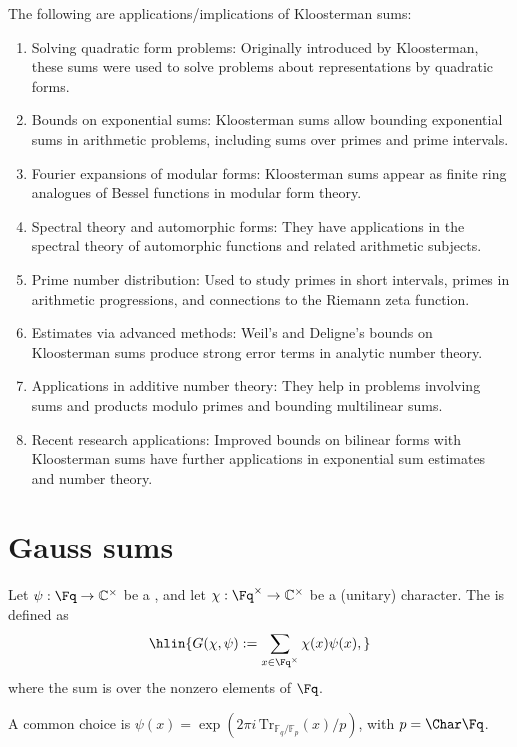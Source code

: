 The following are applications/implications of Kloosterman sums:
\begin{enumerate}
  \item Solving quadratic form problems: Originally introduced by Kloosterman, these sums were used to solve problems about representations by quadratic forms.
  \item Bounds on exponential sums: Kloosterman sums allow bounding exponential sums in arithmetic problems, including sums over primes and prime intervals.
  \item Fourier expansions of modular forms: Kloosterman sums appear as finite ring analogues of Bessel functions in modular form theory.
  \item Spectral theory and automorphic forms: They have applications in the spectral theory of automorphic functions and related arithmetic subjects.
  \item Prime number distribution: Used to study primes in short intervals, primes in arithmetic progressions, and connections to the Riemann zeta function.
  \item Estimates via advanced methods: Weil’s and Deligne’s bounds on Kloosterman sums produce strong error terms in analytic number theory.
  \item Applications in additive number theory: They help in problems involving sums and products modulo primes and bounding multilinear sums.
  \item Recent research applications: Improved bounds on bilinear forms with Kloosterman sums have further applications in exponential sum estimates and number theory.
\end{enumerate}


\section{Gauss sums}

\begin{definition} \label{definition:gauss_}
    Let $\psi : \Fq \to \mathbb{C}^\times$ be a    , and let 
    $\chi : \Fq^\times \to \mathbb{C}^\times$
    be a  (unitary) character.  
    The  is defined as  
    $$\hlin{G(\chi, \psi) := \sum_{x \in \Fq^\times} \chi(x) \psi(x),}$$  
    where the sum is over the nonzero elements of $\Fq$.

    A common choice is $\psi(x) = \exp\left(2\pi i \, \mathrm{Tr}_{\mathbb{F}_q/\mathbb{F}_p}(x)/p\right)$, with $p = \Char \Fq$.
\end{definition}

